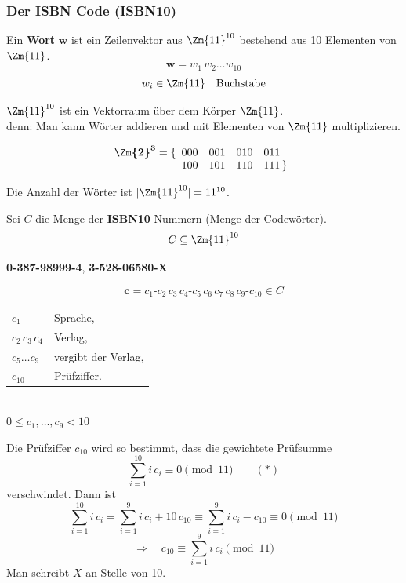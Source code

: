 \subsubsection*{Der ISBN Code (ISBN10)}


\begin{definition}[Wort]
Ein \textbf{Wort} $\boldsymbol{w}$ ist ein Zeilenvektor aus $\Zm{11}^{10}$ bestehend aus 10 Elementen von $\Zm{11}$.
\[ \boldsymbol{w} = w_1\, w_2 \ldots w_{10} \]
\[ w_i \in \Zm{11} \quad \text{Buchstabe} \]
\end{definition}

$\Zm{11}^{10}$ ist ein Vektorraum über dem Körper $\Zm{11}$.\\
denn: Man kann Wörter addieren und mit Elementen von $\Zm{11}$ multiplizieren.

\begin{beispiel}
\[ \boldsymbol{\Zm{2}^3} = \{ \begin{array}[t]{llll} 000 & 001 & 010 & 011 \\ 100 & 101 & 110 & 111 \,\} \end{array} \]
\end{beispiel}

\begin{satz}
Die Anzahl der Wörter ist $|\Zm{11}^{10}| = 11^{10}$.
\end{satz}

Sei $C$ die Menge der \textbf{ISBN10}-Nummern (Menge der Codewörter).
\[ C \subseteq \Zm{11}^{10} \]

\begin{beispiel}
\textbf{0-387-98999-4}, \quad \textbf{3-528-06580-$\boldsymbol{X}$}
\end{beispiel}

\[ \boldsymbol{c} = c_1\text{-}c_2\, c_3\, c_4\text{-}c_5\, c_6\, c_7\, c_8\, c_9\text{-}c_{10} \in C \]
\begin{tabular}{ll}
$c_1$ & Sprache, \\
$c_2\, c_3\, c_4$ & Verlag, \\
$c_5 \ldots c_9$ & vergibt der Verlag, \\
$c_{10}$ & Prüfziffer.
\end{tabular}\\
$0 \leq c_1, \ldots, c_9 < 10$

Die Prüfziffer $c_{10}$ wird so bestimmt, dass die gewichtete Prüfsumme
\[ \sum_{i=1}^{10} i\, c_i \equiv 0 \pmod{11} \qquad (*) \]
verschwindet. Dann ist
\[ \sum_{i=1}^{10} i\, c_i = \sum_{i=1}^{9} i\, c_i + 10\, c_{10} \equiv \sum_{i=1}^{9} i\, c_i - c_{10} \equiv 0 \pmod{11} \]
\[ \Rightarrow \quad c_{10} \equiv \sum_{i=1}^{9} i\, c_i \pmod{11} \]
Man schreibt $X$ an Stelle von 10.

